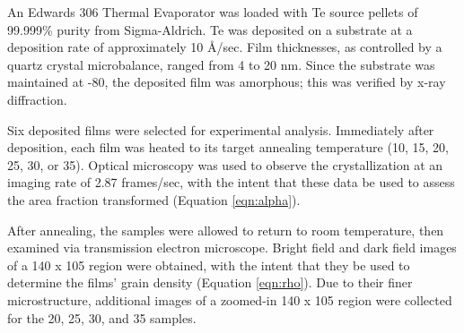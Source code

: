 An Edwards 306 Thermal Evaporator was loaded with Te source pellets of 99.999\% purity from Sigma-Aldrich.  Te was deposited on a substrate at a deposition rate of approximately 10 \r{A}/sec.  Film thicknesses, as controlled by a quartz crystal microbalance, ranged from 4 to 20 nm.  Since the substrate was maintained at -80, the deposited film was amorphous; this was verified by x-ray diffraction.

Six deposited films were selected for experimental analysis.  Immediately after deposition, each film was heated to its target annealing temperature (10, 15, 20, 25, 30, or 35).  Optical microscopy was used to observe the crystallization at an imaging rate of 2.87 frames/sec, with the intent that these data be used to assess the area fraction transformed (Equation \ref{eqn:alpha}).

After annealing, the samples were allowed to return to room temperature, then examined via transmission electron microscope.  Bright field and dark field images of a 140  x 105  region were obtained, with the intent that they be used to determine the films' grain density (Equation \ref{eqn:rho}).  Due to their finer microstructure, additional images of a zoomed-in 140  x 105  region were collected for the 20, 25, 30, and 35 samples.
